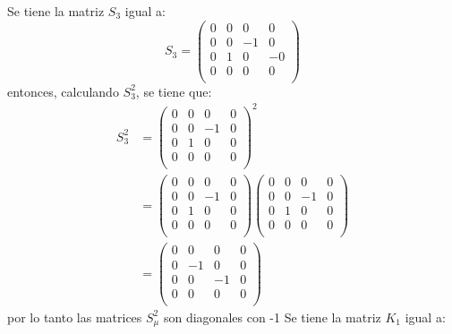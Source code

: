 \documentclass[12pt,letterpaper]{report}
\begin{document}
\begin{enumerate}
    Se tiene la matriz $S_3$ igual a:
    \begin{equation*}
        S_3 =\left( \begin{matrix}
            0 & 0 & 0 & 0 \\
            0 & 0 & -1 & 0 \\
            0 & 1 & 0 & -0 \\
            0 & 0 & 0 & 0 \\
        \end{matrix}\right)
    \end{equation*}
    entonces, calculando $S_3^2$, se tiene que:
    \begin{align*}
        S_3^2 &=\left( \begin{matrix}
            0 & 0 & 0 & 0 \\
            0 & 0 & -1 & 0 \\
            0 & 1 & 0 & 0 \\
            0 & 0 & 0 & 0 \\
        \end{matrix}\right)^2 \\
        & =\left( \begin{matrix}
            0 & 0 & 0 & 0 \\
            0 & 0 & -1 & 0 \\
            0 & 1 & 0 & 0 \\
            0 & 0 & 0 & 0 \\
        \end{matrix}\right)\left( \begin{matrix}
            0 & 0 & 0 & 0 \\
            0 & 0 & -1 & 0 \\
            0 & 1 & 0 & 0 \\
            0 & 0 & 0 & 0 \\
        \end{matrix}\right)\\
        & =\left( \begin{matrix}
            0 & 0 & 0 & 0 \\
            0 & -1 & 0 & 0 \\
            0 & 0 & -1 & 0 \\
            0 & 0 & 0 & 0 \\
        \end{matrix}\right)
    \end{align*}
    por lo tanto las matrices $S_\mu^2$ son diagonales con -1
    Se tiene la matriz $K_1$ igual a:
    \begin{equation*}

\end{equation*}
\end{enumerate}
\end{document}

